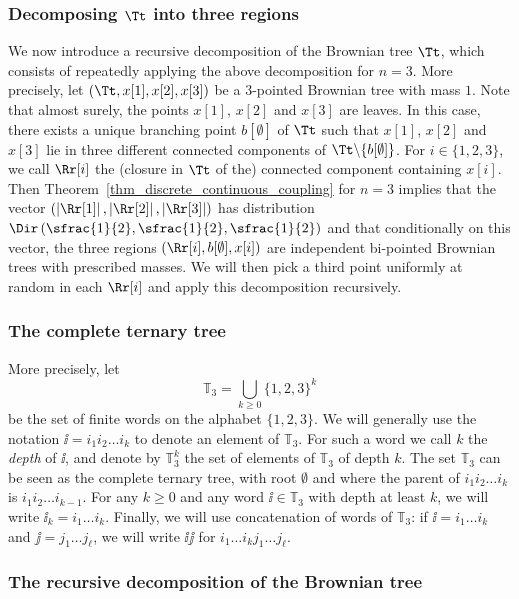 \subsubsection*{Decomposing $\Tt$ into three regions}
We now introduce a recursive decomposition of the Brownian tree $\Tt$, which consists of repeatedly applying the above decomposition for $n=3$.
More precisely, let $\left( \Tt, x[1], x[2], x[3] \right)$ be a $3$-pointed Brownian tree with mass $1$.
Note that almost surely, the points $x[1]$, $x[2]$ and $x[3]$ are leaves.
In this case, there exists a unique branching point $b[\emptyset]$ of $\Tt$ such that $x[1]$, $x[2]$ and $x[3]$ lie in three different connected components of $\Tt \backslash \{b[\emptyset]\}$.
For $i \in \{1,2,3\}$, we call $\Rr[i]$ the (closure in $\Tt$ of the) connected component containing $x[i]$.
Then Theorem~\ref{thm_discrete_continuous_coupling} for $n=3$ implies that the vector $\left( \left| \Rr[1] \right|, \left| \Rr[2] \right|, \left| \Rr[3] \right| \right)$ has distribution $\Dir \left( \sfrac{1}{2}, \sfrac{1}{2}, \sfrac{1}{2} \right)$ and that conditionally on this vector, the three regions $\left( \Rr[i], b[\emptyset], x[i] \right)$ are independent bi-pointed Brownian trees with prescribed masses.
We will then pick a third point uniformly at random in each $\Rr[i]$ and apply this decomposition recursively.

\subsubsection*{The complete ternary tree}
More precisely, let\vspace*{-3pt}\enlargethispage{.5\baselineskip}
\[ \mathbb{T}_3=\bigcup_{k \geq 0} \{1,2,3\}^k\]
be the set of finite words on the alphabet $\{1,2,3\}$.
We will generally use the notation $\ii=i_1 i_2 \dots i_k$ to denote an element of $\mathbb{T}_3$.
For such a word we call $k$ the \emph{depth} of $\ii$, and denote by $\mathbb{T}_3^k$ the set of elements of $ \mathbb{T}_3$ of depth $k$.
The set $\mathbb{T}_3$ can be seen as the complete ternary tree, with root $\emptyset$ and where the parent of $i_1 i_2 \dots i_k$ is $i_1 i_2 \dots i_{k-1}$.
For any $k \geq 0$ and any word $\ii \in \mathbb{T}_3$ with depth at least $k$, we will write $\ii_k=i_1 \dots i_k$.
Finally, we will use concatenation of words of $\mathbb{T}_3$: if $\ii=i_1 \dots i_k$ and $\jj=j_1 \dots j_{\ell}$, we will write $\ii\jj$ for $i_1 \dots i_k j_1 \dots j_{\ell}$.

\subsubsection*{The recursive decomposition of the Brownian tree}


